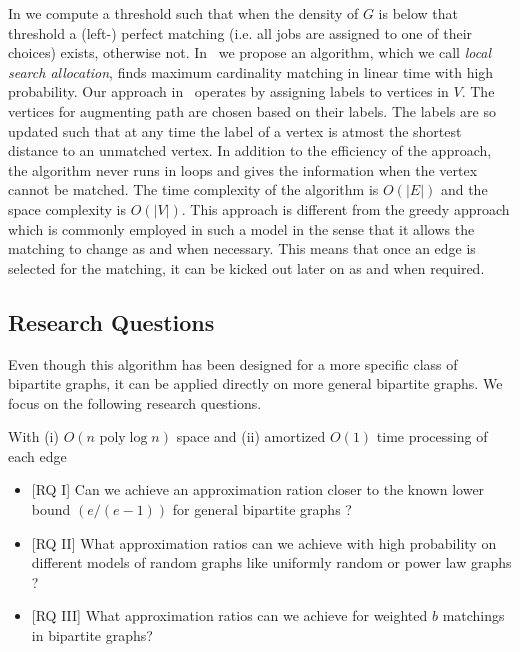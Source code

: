\documentclass{scrartcl}
\begin{document}
In \cite{kCores} we compute a threshold such that when the density of $G$ is below that threshold a (left-) perfect matching (i.e. all jobs are assigned to one of their choices) exists, otherwise not.
%
In~\cite{ballsbins} we propose an algorithm, which we call \emph{local search allocation}, finds maximum cardinality matching in linear time with high probability.
Our approach in~\cite{ballsbins} operates by assigning labels to vertices in $V$. The vertices for augmenting path are chosen based on their labels. The labels are so updated such that at any time the label of a vertex is atmost the shortest distance to an unmatched vertex. In addition to the efficiency of the approach, the algorithm never runs in loops and gives the information when the vertex cannot be matched. The time complexity of the algorithm is $O(|E|)$ and the space complexity is $O(|V|)$. This approach is different from the greedy approach which is commonly employed in such a model in the sense that it allows the matching to change as and when necessary. This means that once an edge is selected for the matching, it can be kicked out later on as and when required.

\subsection{Research Questions}

Even though this algorithm has been designed for a more specific class of bipartite graphs, it can be applied directly on more general bipartite graphs. We focus on the following research questions.

With (i) $O(n \text{ poly} \log n)$ space and  (ii) amortized $O(1)$ time processing of each edge
\begin{itemize}
\item  \textsf{[RQ I]} Can we achieve an approximation ration closer to the known lower bound $(e/(e-1))$ for general bipartite graphs ?
\item \textsf{[RQ II]} What approximation ratios can we achieve with high probability on different models of random graphs like uniformly random or power law graphs ?
\item \textsf{[RQ III]} What approximation ratios can we achieve for weighted $b$ matchings in bipartite graphs?

\end{itemize}
\end{document}
